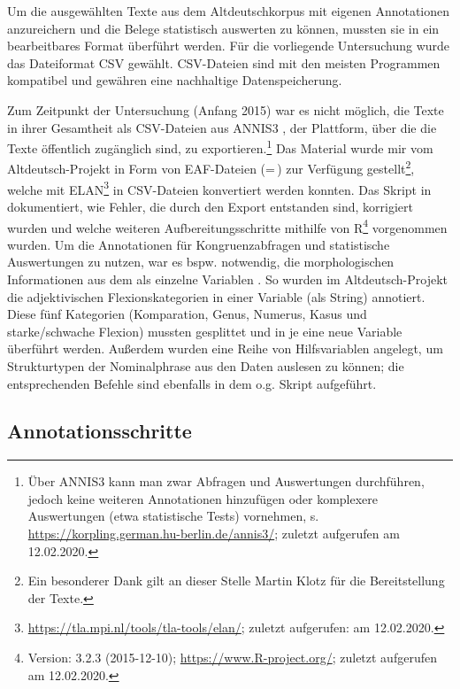 Um die ausgewählten Texte aus dem Altdeutschkorpus  mit eigenen Annotationen  anzureichern und die Belege statistisch auswerten zu können, mussten sie in ein bearbeitbares Format überführt werden. Für die vorliegende Untersuchung wurde das Dateiformat CSV gewählt. CSV-Dateien sind mit den meisten Programmen kompatibel und gewähren eine nachhaltige Datenspeicherung. 

Zum Zeitpunkt der Untersuchung (Anfang 2015) war es nicht möglich, die Texte in ihrer Gesamtheit als CSV-Dateien aus ANNIS3 \parencite{Krause2016}, der Plattform, über die die Texte öffentlich zugänglich sind, zu exportieren.\footnote{Über ANNIS3 kann man zwar Abfragen und Auswertungen durchführen, jedoch keine weiteren Annotationen  hinzufügen oder komplexere Auswertungen (etwa statistische Tests) vornehmen, s. \url{https://korpling.german.hu-berlin.de/annis3/}; zuletzt aufgerufen am 12.02.2020.} Das Material wurde mir vom Altdeutsch-Projekt in Form von EAF-Dateien (=\,) zur Verfügung gestellt\footnote{Ein besonderer Dank gilt an dieser Stelle Martin Klotz für die Bereitstellung der Texte.}, welche mit ELAN\footnote{\url{https://tla.mpi.nl/tools/tla-tools/elan/}; zuletzt aufgerufen: am 12.02.2020.} in CSV-Dateien konvertiert werden konnten. 
Das Skript  in \textcite{HZKYL4_2020} dokumentiert, wie Fehler, die durch den Export entstanden sind, korrigiert wurden und welche weiteren Aufbereitungsschritte mithilfe von R\footnote{Version: 3.2.3 (2015-12-10); \url{https://www.R-project.org/}; zuletzt aufgerufen am 12.02.2020.} vorgenommen wurden. 
Um die Annotationen  für Kongruenzabfragen und statistische Auswertungen zu nutzen, war es bspw. notwendig, die morphologischen Informationen aus dem  als einzelne Variablen . So wurden im Altdeutsch-Projekt die adjektivischen Flexionskategorien in einer Variable (als String)  annotiert. Diese fünf Kategorien (Komparation, Genus, Numerus, Kasus und starke/schwache Flexion) mussten gesplittet und in je eine neue Variable überführt werden. Außerdem wurden eine Reihe von Hilfsvariablen angelegt, um Strukturtypen  der Nominalphrase  aus den Daten auslesen zu können; die entsprechenden Befehle sind ebenfalls in dem o.g. Skript aufgeführt.  

\subsection{Annotationsschritte}\label{sec:annotationsschritte}

